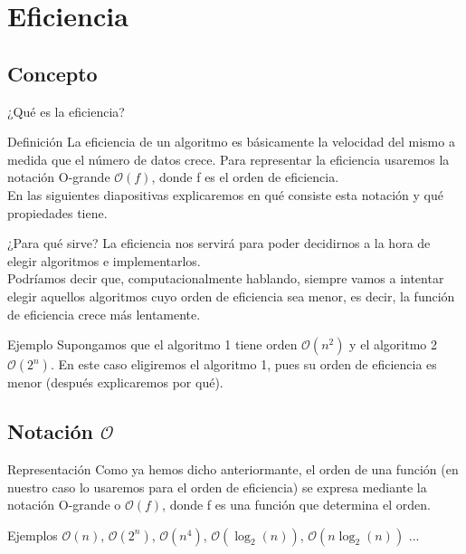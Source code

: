 \documentclass[compress]{beamer}
\begin{document}
\section{Eficiencia}
\subsection{Concepto}

\begin{frame}{¿Qué es la eficiencia?}
	\begin{block}{Definición}
	La eficiencia de un algoritmo es básicamente la velocidad del mismo a medida que el número de datos crece. Para representar la eficiencia usaremos la notación O-grande $\mathcal{O}(f)$, donde f es el orden de eficiencia.\\
	\vspace{0.20in}
	En las siguientes diapositivas explicaremos en qué consiste esta notación y qué propiedades tiene.
	\end{block}
\end{frame}

\begin{frame}{¿Para qué sirve?}
La eficiencia nos servirá para poder decidirnos a la hora de elegir algoritmos e implementarlos.\\
\vspace{0.20in}
Podríamos decir que, computacionalmente hablando, siempre vamos a intentar elegir aquellos algoritmos cuyo orden de eficiencia sea menor, es decir, la función de eficiencia crece más lentamente.\\
\vspace{0.20in}
	\begin{exampleblock}{Ejemplo}
	Supongamos que el algoritmo 1 tiene orden $\mathcal{O}(n^2)$ y el algoritmo 2 $\mathcal{O}(2^n)$. En este caso eligiremos el algoritmo 1, pues su orden de eficiencia es menor (después explicaremos por qué).
	\end{exampleblock}
\end{frame}

\subsection{Notación $\mathcal{O}$}

\begin{frame}{Representación}
Como ya hemos dicho anteriormante, el orden de una función (en nuestro caso lo usaremos para el orden de eficiencia) se expresa mediante la notación O-grande o $\mathcal{O}(f)$, donde f es una función que determina el orden.\\
\vspace{0.20in}
	\begin{exampleblock}{Ejemplos}
	$\mathcal{O}(n)$, $\mathcal{O}(2^n)$, $\mathcal{O}(n^4)$, $\mathcal{O}(\log_2(n))$, $\mathcal{O}(n\log_2(n))$ ...
	\end{exampleblock}
\end{frame}
\end{document}
